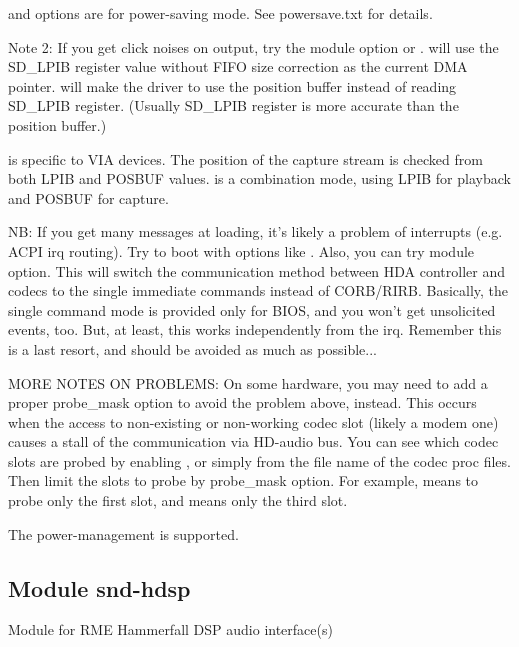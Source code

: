\documentclass[a4paper,8pt,english]{sphinxmanual}
\begin{document}
 and  options are for power-saving
mode.  See powersave.txt for details.

Note 2: If you get click noises on output, try the module option
 or .   will use the SD\_LPIB
register value without FIFO size correction as the current
DMA pointer.   will make the driver to use
the position buffer instead of reading SD\_LPIB register.
(Usually SD\_LPIB register is more accurate than the
position buffer.)

 is specific to VIA devices.  The position
of the capture stream is checked from both LPIB and POSBUF
values.   is a combination mode, using LPIB
for playback and POSBUF for capture.

NB: If you get many  messages at
loading, it's likely a problem of interrupts (e.g. ACPI irq
routing).  Try to boot with options like .  Also, you
can try  module option.  This will switch the
communication method between HDA controller and codecs to the
single immediate commands instead of CORB/RIRB.  Basically, the
single command mode is provided only for BIOS, and you won't get
unsolicited events, too.  But, at least, this works independently
from the irq.  Remember this is a last resort, and should be
avoided as much as possible...

MORE NOTES ON  PROBLEMS:
On some hardware, you may need to add a proper probe\_mask option
to avoid the  problem above, instead.
This occurs when the access to non-existing or non-working codec slot
(likely a modem one) causes a stall of the communication via HD-audio
bus.  You can see which codec slots are probed by enabling
, or simply from the file name of the codec
proc files.  Then limit the slots to probe by probe\_mask option.
For example,  means to probe only the first slot, and
 means only the third slot.

The power-management is supported.


\subsection{Module snd-hdsp}
\label{sound/alsa-configuration:module-snd-hdsp}
Module for RME Hammerfall DSP audio interface(s)
\end{document}
